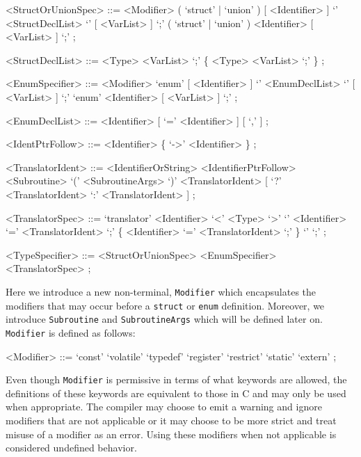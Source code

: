 \begin{grammar}
<StructOrUnionSpec> ::=  <Modifier> ( `struct' | `union' ) [ <Identifier> ] \newline
                         `{' <StructDeclList> `}' [ <VarList> ] `;'
                    \alt ( `struct' | `union' ) <Identifier> [ <VarList> ] `;' ;

<StructDeclList> ::= <Type> <VarList> `;' \{ <Type> <VarList> `;' \} ;

<EnumSpecifier> ::=  <Modifier> `enum' [ <Identifier> ] \newline
                     `{' <EnumDeclList> `}' [ <VarList> ] `;'
                \alt `enum' <Identifier> [ <VarList> ] `;' ;

<EnumDeclList> ::= <Identifier> [ `=' <Identifier> ] [ `,' ] ;

<IdentPtrFollow> ::= <Identifier> \{ `->' <Identifier> \} ;

<TranslatorIdent> ::=  <IdentifierOrString>
                  \alt <IdentifierPtrFollow>
                  \alt <Subroutine> `(' <SubroutineArgs> `)'
                  \alt <TranslatorIdent> [ `?' <TranslatorIdent> `:' <TranslatorIdent> ] ;

<TranslatorSpec> ::= `translator' <Identifier> `<' <Type> `>' `{' \newline
	<Identifier> `=' <TranslatorIdent> `;' \newline
        \{ <Identifier> `=' <TranslatorIdent> `;' \} `}' `;' ;

<TypeSpecifier> ::=  <StructOrUnionSpec>
                \alt <EnumSpecifier>
                \alt <TranslatorSpec> ;
\end{grammar}

\noindent
Here we introduce a new non-terminal, \texttt{Modifier} which encapsulates the
modifiers that may occur before a \texttt{struct} or \texttt{enum} definition.
Moreover, we introduce \texttt{Subroutine} and \texttt{SubroutineArgs} which
will be defined later on. \texttt{Modifier} is defined as follows:

\begin{grammar}
<Modifier> ::=  `const'
           \alt `volatile'
           \alt `typedef'
           \alt `register'
           \alt `restrict'
           \alt `static'
           \alt `extern' ;
\end{grammar}

\noindent
Even though \texttt{Modifier} is permissive in terms of what keywords are
allowed, the definitions of these keywords are equivalent to those in C and may
only be used when appropriate. The compiler may choose to emit a warning and
ignore modifiers that are not applicable or it may choose to be more strict and
treat misuse of a modifier as an error. Using these modifiers when not
applicable is considered undefined behavior. \newline

